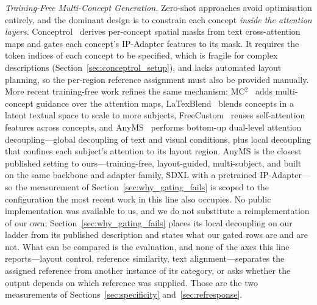 \documentclass[review,10pt,times]{elsarticle}
\begin{document}
\noindent\textit{Training-Free Multi-Concept Generation.}
Zero-shot approaches avoid optimisation entirely, and the dominant design is
to constrain each concept \emph{inside the attention layers}.
Conceptrol~\cite{he2025conceptrol} derives per-concept spatial masks
from text cross-attention maps and gates each concept's IP-Adapter
features to its mask.  It requires the token indices of each concept to be
specified, which is fragile for complex descriptions (Section~\ref{sec:conceptrol_setup}),
and lacks automated layout planning, so the per-region reference assignment
must also be provided manually.
More recent training-free work refines the same mechanism:
MC$^2$~\cite{mc2_2025} adds multi-concept guidance over the attention
maps, LaTexBlend~\cite{latexblend2025} blends concepts in a latent
textual space to scale to more subjects,
FreeCustom~\cite{freecustom2024} reuses self-attention features
across concepts, and AnyMS~\cite{yu2025anyms} performs bottom-up
dual-level attention decoupling---global decoupling of text and visual
conditions, plus local decoupling that confines each subject's
attention to its layout region.
AnyMS is the closest published setting to ours---training-free,
layout-guided, multi-subject, and built on the same backbone and adapter
family, SDXL with a pretrained IP-Adapter---so the measurement of
Section~\ref{sec:why_gating_fails} is scoped to the configuration the most
recent work in this line also occupies.  No public implementation was
available to us, and we do not substitute a reimplementation of our own;
Section~\ref{sec:why_gating_fails} places its local decoupling on our ladder
from its published description and states what our gated rows are and are
not.  What can be compared is the evaluation, and none of the axes this line
reports---layout control, reference similarity, text alignment---separates the
assigned reference from another instance of its category, or asks whether the
output depends on which reference was supplied.  Those are the two
measurements of Sections~\ref{sec:specificity} and~\ref{sec:refresponse}.
\end{document}
